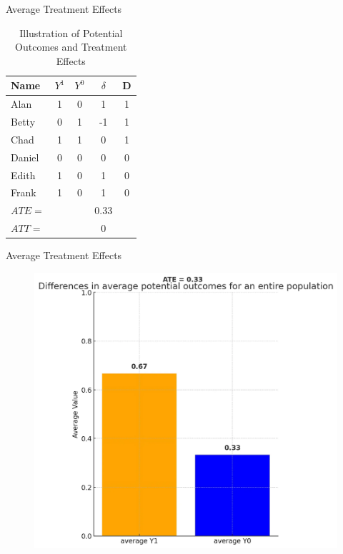 \documentclass{beamer}
\begin{document}
\begin{frame}{Average Treatment Effects}

\begin{table}[htbp]\centering
\caption{Illustration of Potential Outcomes and Treatment Effects}\label{tab:step1_table}
\begin{tabular}{lccc|c}
\toprule
\textbf{Name} & \textbf{$Y^1$} & \textbf{$Y^0$} & \textbf{$\delta$} & \textbf{D}  \\
\midrule
Alan    & 1 & 0 & 1  & 1  \\
Betty   & 0 & 1 & -1 & 1  \\
Chad    & 1 & 1 & 0  & 1  \\
Daniel  & 0 & 0 & 0  & 0  \\
Edith   & 1 & 0 & 1  & 0  \\
Frank   & 1 & 0 & 1  & 0  \\
\midrule
$ATE =$&&& 0.33 \\
$ATT =$&&&0 \\
\bottomrule
\end{tabular}
\end{table}  

\end{frame}

\begin{frame}{Average Treatment Effects}

\begin{figure}
    \centering
    \includegraphics[height=0.8\textheight]{./lecture_includes/step1_y1y0}
\end{figure}


\end{frame}
\end{document}
